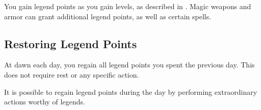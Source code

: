 You gain legend points as you gain levels, as described in .
Magic weapons and armor can grant additional legend points, as well as certain spells.

\subsection{Restoring Legend Points}

At dawn each day, you regain all legend points you spent the previous day.
This does not require rest or any specific action.

It is possible to regain legend points during the day by performing extraordinary actions worthy of legends.
